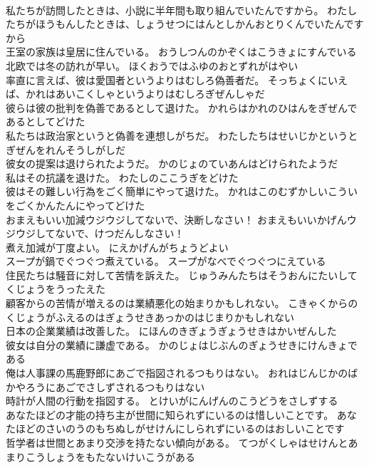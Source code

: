 \documentclass[8pt]{extreport}
\begin{document}
\begin{CJK}{UTF8}{min}
\\	私たちが訪問したときは、小説に半年間も取り組んでいたんですから。	わたしたちがほうもんしたときは、しょうせつにはんとしかんおとりくんでいたんですから 
\\	王室の家族は皇居に住んでいる。	おうしつんのかぞくはこうきょにすんでいる 
\\	北欧では冬の訪れが早い。	ほくおうではふゆのおとずれがはやい 
\\	率直に言えば、彼は愛国者というよりはむしろ偽善者だ。	そっちょくにいえば、かれはあいこくしゃというよりはむしろぎぜんしゃだ 
\\	彼らは彼の批判を偽善であるとして退けた。	かれらはかれのひはんをぎぜんであるとしてどけた 
\\	私たちは政治家というと偽善を連想しがちだ。	わたしたちはせいじかというとぎぜんをれんそうしがしだ 
\\	彼女の提案は退けられたようだ。	かのじょのていあんはどけられたようだ 
\\	私はその抗議を退けた。	わたしのここうぎをどけた 
\\	彼はその難しい行為をごく簡単にやって退けた。	かれはこのむずかしいこういをごくかんたんにやってどけた 
\\	おまえもいい加減ウジウジしてないで、決断しなさい！	おまえもいいかげんウジウジしてないで、けつだんしなさい！ 
\\	煮え加減が丁度よい。	にえかげんがちょうどよい 
\\	スープが鍋でぐつぐつ煮えている。	スープがなべでぐつぐつにえている 
\\	住民たちは騒音に対して苦情を訴えた。	じゅうみんたちはそうおんにたいしてくじょうをうったえた 
\\	顧客からの苦情が増えるのは業績悪化の始まりかもしれない。	こきゃくからのくじょうがふえるのはぎょうせきあっかのはじまりかもしれない 
\\	日本の企業業績は改善した。	にほんのきぎょうぎょうせきはかいぜんした 
\\	彼女は自分の業績に謙虚である。	かのじょはじぶんのぎょうせきにけんきょである 
\\	俺は人事課の馬鹿野郎にあごで指図されるつもりはない。	おれはじんじかのばかやろうにあごでさしずされるつもりはない 
\\	時計が人間の行動を指図する。	とけいがにんげんのこうどうをさしずする 
\\	あなたほどの才能の持ち主が世間に知られずにいるのは惜しいことです。	あなたほどのさいのうのもちぬしがせけんにしられずにいるのはおしいことです 
\\	哲学者は世間とあまり交渉を持たない傾向がある。	てつがくしゃはせけんとあまりこうしょうをもたないけいこうがある 

\end{CJK}
\end{document}

